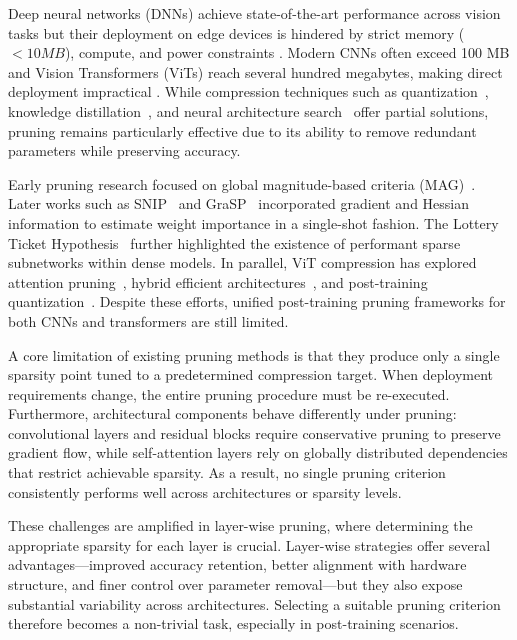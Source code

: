 \documentclass[11pt, conference]{IEEEtran}
\begin{document}
Deep neural networks (DNNs) achieve state-of-the-art performance across vision tasks but their deployment on edge devices is hindered by strict memory ($<10 MB$), compute, and power constraints \cite{}. Modern CNNs often exceed 100 MB and Vision Transformers (ViTs) reach several hundred megabytes, making direct deployment impractical \cite{}. While compression techniques such as quantization~\cite{jacob2018quantization}, knowledge distillation~\cite{hinton2015distilling}, and neural architecture search~\cite{zoph2017neural} offer partial solutions, pruning remains particularly effective due to its ability to remove redundant parameters while preserving accuracy.

Early pruning research focused on global magnitude-based criteria (MAG)~\cite{han2015learning}. Later works such as SNIP~\cite{lee2018snip} and GraSP~\cite{wang2020picking} incorporated gradient and Hessian information to estimate weight importance in a single-shot fashion. The Lottery Ticket Hypothesis~\cite{frankle2019lottery} further highlighted the existence of performant sparse subnetworks within dense models. In parallel, ViT compression has explored attention pruning~\cite{michel2019heads}, hybrid efficient architectures~\cite{liu2021swin,graham2021levit}, and post-training quantization~\cite{jacob2018quantization}. Despite these efforts, unified post-training pruning frameworks for both CNNs and transformers are still limited.

A core limitation of existing pruning methods is that they produce only a single sparsity point tuned to a predetermined compression target. When deployment requirements change, the entire pruning procedure must be re-executed. Furthermore, architectural components behave differently under pruning: convolutional layers and residual blocks require conservative pruning to preserve gradient flow, while self-attention layers rely on globally distributed dependencies that restrict achievable sparsity. As a result, no single pruning criterion consistently performs well across architectures or sparsity levels.

These challenges are amplified in layer-wise pruning, where determining the appropriate sparsity for each layer is crucial. Layer-wise strategies offer several advantages—improved accuracy retention, better alignment with hardware structure, and finer control over parameter removal—but they also expose substantial variability across architectures. Selecting a suitable pruning criterion therefore becomes a non-trivial task, especially in post-training scenarios.
\end{document}
